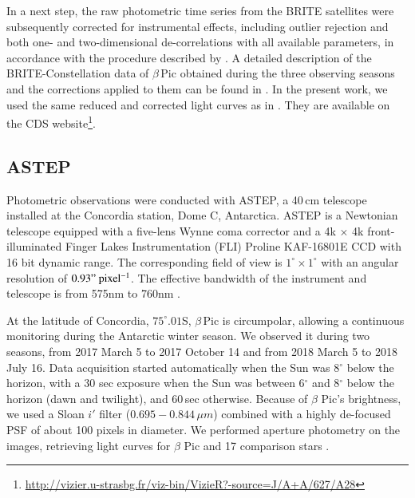 \documentclass[longauth]{aa} %
\newcommand{\bp}{$\beta$\,Pic}
\begin{document}
In a next step, the raw photometric time series from the BRITE satellites were subsequently corrected for instrumental effects, including outlier rejection and both one- and two-dimensional de-correlations with all available parameters, in accordance with the procedure described by \citet{pigulski2018}.
%
A detailed description of the BRITE-Constellation data of \bp{} obtained during the three observing seasons and the corrections applied to them can be found in \citet{Zwintz19}.
%
In the present work, we used the same reduced and corrected light curves as in \citet{Zwintz19}. They are available on the CDS website\footnote{\href{http://vizier.u-strasbg.fr/viz-bin/VizieR?-source=J/A+A/627/A28}{http://vizier.u-strasbg.fr/viz-bin/VizieR?-source=J/A+A/627/A28}}.        

\subsection{ASTEP}

Photometric observations were conducted with ASTEP, a 40\,cm telescope installed at the Concordia station, Dome C, Antarctica.
%
ASTEP is a Newtonian telescope equipped with a five-lens Wynne coma corrector and a 4k $\times$ 4k front-illuminated Finger Lakes Instrumentation (FLI) Proline KAF-16801E CCD with 16 bit dynamic range.
%
The corresponding field of view is $1^\circ\times 1^\circ$ with an angular resolution of $0.93"\rm\ pixel^{-1}$.
%
The effective bandwidth of the instrument and telescope is from 575nm to 760nm \citep{Abe13}.

At the latitude of Concordia, $75^{\circ}.01$S, $\beta$\,Pic is circumpolar, allowing a continuous monitoring during the Antarctic winter season.
%
We observed it during two seasons, from
2017 March 5 to 2017 October 14 and from 2018 March 5 to 2018 July 16.
%
Data acquisition started automatically when the Sun was 8$^{\circ}$ below the horizon, with a 30 sec exposure when the Sun was between 6$^{\circ}$ and 8$^{\circ}$ below the horizon (dawn and twilight), and 60\,sec otherwise.
%
Because of $\beta$ Pic's brightness, we used a Sloan $i'$ filter ($0.695-0.844\,\mu m$) combined with a highly de-focused PSF of about 100 pixels in diameter.
%
We performed aperture photometry on the images, retrieving light curves for $\beta$ Pic and 17 comparison stars \citep[see][]{Mekarnia2017}.
\end{document}
